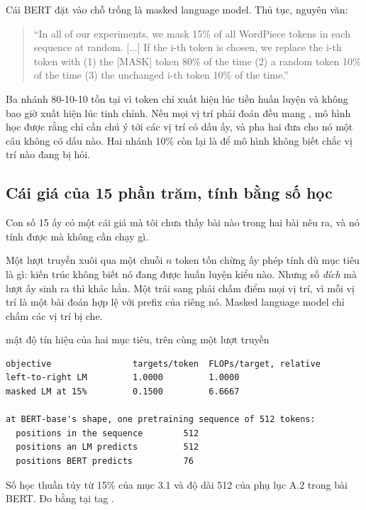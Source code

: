 Cái BERT đặt vào chỗ trống là masked language model. Thủ tục, nguyên văn:

\begin{quote}
\enquote{In all of our experiments, we mask 15\% of all WordPiece tokens in each
sequence at random. [...] If the i-th token is chosen, we replace the i-th token
with (1) the [MASK] token 80\% of the time (2) a random token 10\% of the time
(3) the unchanged i-th token 10\% of the time.}
\end{quote}

Ba nhánh 80-10-10 tồn tại vì token \code{[MASK]} chỉ xuất hiện lúc tiền huấn
luyện và không bao giờ xuất hiện lúc tinh chỉnh. Nếu mọi vị trí phải đoán đều
mang \code{[MASK]}, mô hình học được rằng chỉ cần chú ý tới các vị trí có dấu
ấy, và pha hai đưa cho nó một câu không có dấu nào. Hai nhánh 10\% còn lại là để
mô hình không biết chắc vị trí nào đang bị hỏi.

\subsection*{Cái giá của 15 phần trăm, tính bằng số học}

%
Con số 15 ấy có một cái giá mà tôi chưa thấy bài nào trong hai bài nêu ra, và
nó tính được mà không cần chạy gì.

Một lượt truyền xuôi qua một chuỗi \(n\) token tốn chừng ấy phép tính dù mục
tiêu là gì: kiến trúc không biết nó đang được huấn luyện kiểu nào. Nhưng số
\emph{đích} mà lượt ấy sinh ra thì khác hẳn. Một  trái sang phải chấm điểm mọi vị trí, vì mỗi vị trí là một bài đoán hợp lệ
với prefix của riêng nó. Masked language model chỉ chấm các vị trí bị che.

\begin{measured}{mật độ tín hiệu của hai mục tiêu, trên cùng một lượt truyền}
\begin{verbatim}
objective                targets/token  FLOPs/target, relative
left-to-right LM         1.0000         1.0000
masked LM at 15%         0.1500         6.6667

at BERT-base's shape, one pretraining sequence of 512 tokens:
  positions in the sequence        512
  positions an LM predicts         512
  positions BERT predicts          76
\end{verbatim}

Số học thuần túy từ 15\% của mục 3.1 và độ dài 512 của phụ lục A.2 trong bài
BERT. Đo bằng  tại tag .
\end{measured}

